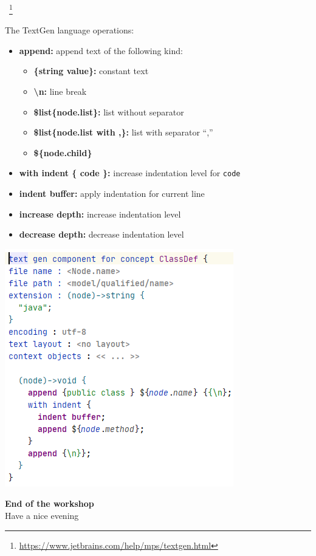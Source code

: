 	\begin{frame}{\workshoptextgen\ \footnote{\url{https://www.jetbrains.com/help/mps/textgen.html}}}
	\begin{minipage}{0.52\textwidth}
		The TextGen language operations:\\
		\begin{itemize}
			\item \textbf{append:} append text of the following kind:
			\begin{itemize}
				\item \textbf{\{string value\}:} constant text
				\item \textbf{\textbackslash n:} line break
				\item \textbf{\$list\{node.list\}:} list without separator
				\item \textbf{\$list\{node.list with ,\}:} list with separator ``,''
				\item \textbf{\$\{node.child\}}
			\end{itemize}
			\item \textbf{with indent \{ code \}:} increase indentation level for \texttt{code}
			\item \textbf{indent buffer:} apply indentation for current line
			\item \textbf{increase depth:} increase indentation level
			\item \textbf{decrease depth:} decrease indentation level
		\end{itemize}
	\end{minipage}
	\begin{minipage}{0.4\textwidth}
		\includegraphics[height=0.9\textheight]{illustrations/textgen.png}
	\end{minipage}
	\end{frame}

	\begin{frame}
		\begin{center}
			\Huge \textbf{End of the workshop}\\
			
			Have a nice evening
		\end{center}
	\end{frame}	
